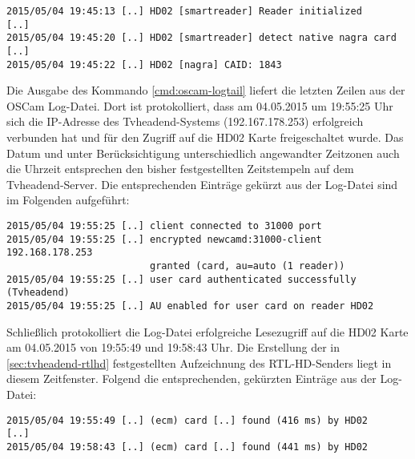 \begin{verbatim}
2015/05/04 19:45:13 [..] HD02 [smartreader] Reader initialized
[..]
2015/05/04 19:45:20 [..] HD02 [smartreader] detect native nagra card
[..]
2015/05/04 19:45:22 [..] HD02 [nagra] CAID: 1843
\end{verbatim}

Die Ausgabe des Kommando \autoref{cmd:oscam-logtail} liefert die letzten Zeilen aus der OSCam Log-Datei. Dort ist protokolliert, dass am 04.05.2015 um 19:55:25 Uhr sich die IP-Adresse des Tvheadend-Systems (192.167.178.253) erfolgreich verbunden hat und für den Zugriff auf die HD02 Karte freigeschaltet wurde. Das Datum und unter Berücksichtigung unterschiedlich angewandter Zeitzonen auch die Uhrzeit entsprechen den bisher festgestellten Zeitstempeln auf dem Tvheadend-Server. Die entsprechenden Einträge gekürzt aus der Log-Datei sind im Folgenden aufgeführt:

\begin{verbatim}
2015/05/04 19:55:25 [..] client connected to 31000 port
2015/05/04 19:55:25 [..] encrypted newcamd:31000-client 192.168.178.253
                         granted (card, au=auto (1 reader))
2015/05/04 19:55:25 [..] user card authenticated successfully (Tvheadend)
2015/05/04 19:55:25 [..] AU enabled for user card on reader HD02
\end{verbatim}

Schließlich protokolliert die Log-Datei erfolgreiche Lesezugriff auf die HD02 Karte am 04.05.2015 von 19:55:49 und 19:58:43 Uhr. Die Erstellung der in \autoref{sec:tvheadend-rtlhd} festgestellten Aufzeichnung des RTL-HD-Senders liegt in diesem Zeitfenster. Folgend die entsprechenden, gekürzten Einträge aus der Log-Datei:

\begin{verbatim}
2015/05/04 19:55:49 [..] (ecm) card [..] found (416 ms) by HD02
[..]
2015/05/04 19:58:43 [..] (ecm) card [..] found (441 ms) by HD02
\end{verbatim}
